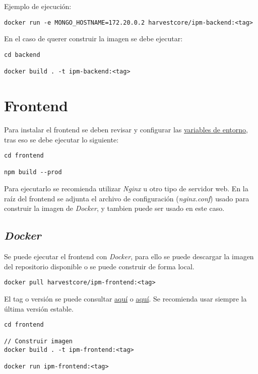 Ejemplo de ejecución:

\begin{lstlisting}
docker run -e MONGO_HOSTNAME=172.20.0.2 harvestcore/ipm-backend:<tag>
\end{lstlisting}

En el caso de querer construir la imagen se debe ejecutar:

\begin{lstlisting}
cd backend

docker build . -t ipm-backend:<tag>
\end{lstlisting}





\section{Frontend}

Para instalar el frontend se deben revisar y configurar las \hyperref[sec:variables]{variables de entorno}, tras eso se debe ejecutar lo siguiente:

\begin{lstlisting}
cd frontend

npm build --prod
\end{lstlisting}

Para ejecutarlo se recomienda utilizar \textit{Nginx} u otro tipo de servidor web. En la raíz del frontend se adjunta el archivo de configuración (\textit{nginx.conf}) usado para construir la imagen de \textit{Docker}, y tambien puede ser usado en este caso.



\subsection{\textit{Docker}}

Se puede ejecutar el frontend con \textit{Docker}, para ello se puede descargar la imagen del repositorio disponible o se puede construir de forma local.

\begin{lstlisting}
docker pull harvestcore/ipm-frontend:<tag>
\end{lstlisting}

El tag o versión se puede consultar \href{https://github.com/harvestcore/tfg/releases}{aquí} o \href{https://hub.docker.com/r/harvestcore/ipm-frontend/tags}{aquí}. Se recomienda usar siempre la última versión estable.

\begin{lstlisting}
cd frontend

// Construir imagen
docker build . -t ipm-frontend:<tag>

docker run ipm-frontend:<tag>
\end{lstlisting}



